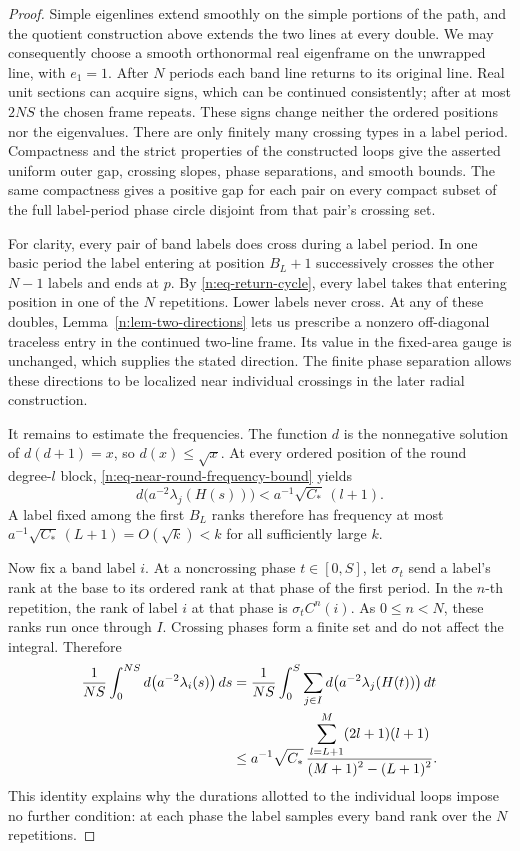 \begin{proof}
Simple eigenlines extend smoothly on the simple portions of the path,
and the quotient construction above extends the two lines at every
double.  We may consequently choose a smooth orthonormal real
eigenframe on the unwrapped line, with \(e_1=1\).  After \(N\)
periods each band line returns to its original line.  Real unit
sections can acquire signs, which can be continued consistently;
after at most \(2NS\) the chosen frame repeats.  These signs change
neither the ordered positions nor the eigenvalues.  There are only
finitely many crossing types in a label period.  Compactness and
the strict properties of the constructed loops give the asserted
uniform outer gap, crossing slopes, phase separations, and smooth
bounds.  The same compactness gives a positive gap for each pair on
every compact subset of the full label-period phase circle disjoint
from that pair's crossing set.

For clarity, every pair of band labels does cross during a label
period.  In one basic period the label entering at position \(B_L+1\)
successively crosses the other \(N-1\) labels and ends at \(p\).
By \eqref{n:eq-return-cycle}, every label takes that entering
position in one of the \(N\) repetitions.  Lower labels never
cross.  At any of these doubles, Lemma~\ref{n:lem-two-directions}
lets us prescribe a nonzero off-diagonal traceless entry in the
continued two-line frame.  Its value in the fixed-area gauge is
unchanged, which supplies the stated direction.  The finite
phase separation allows these directions to be localized near
individual crossings in the later radial construction.

It remains to estimate the frequencies.  The function \(d\)
is the nonnegative solution of \(d(d+1)=x\), so \(d(x)\leq\sqrt x\).
At every ordered position of the round degree-\(l\) block,
\eqref{n:eq-near-round-frequency-bound} yields
\[
 d\bigl(a^{-2}\lambda_j(H(s))\bigr)
 <a^{-1}\sqrt{C_*}\,(l+1).
\]
A label fixed among the first \(B_L\) ranks therefore has frequency
at most \(a^{-1}\sqrt{C_*}\,(L+1)=O(\sqrt{k})<k\) for all
sufficiently large \(k\).

Now fix a band label \(i\).  At a noncrossing phase \(t\in[0,S]\),
let \(\sigma_t\) send a label's rank at the base to its ordered
rank at that phase of the first period.  In the \(n\)-th repetition,
the rank of label \(i\) at that phase is
\(\sigma_t C^n(i)\).  As \(0\leq n<N\), these ranks run once
through \(I\).  Crossing phases form a finite set and do not affect
the integral.  Therefore
\begin{align}
 \frac1{NS}\int_0^{NS}d\bigl(a^{-2}\lambda_i(s)\bigr)\,ds
 &=\frac1{NS}\int_0^S
       \sum_{j\in I}d\bigl(a^{-2}\lambda_j(H(t))\bigr)\,dt
       \notag\\
 &\leq a^{-1}\sqrt{C_*}\,
   \frac{\displaystyle\sum_{l=L+1}^{M}(2l+1)(l+1)}
        {\displaystyle(M+1)^2-(L+1)^2}.
 \label{n:eq-band-frequency-average}
\end{align}
This identity explains why the durations allotted to the individual
loops impose no further condition: at each phase the label samples
every band rank over the \(N\) repetitions.


\end{proof}
